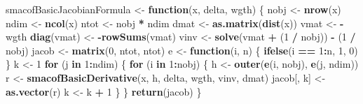 \documentclass[
  12pt,
]{article}
\newenvironment{Shaded}{\begin{snugshade}}{\end{snugshade}}
\newcommand{\ControlFlowTok}[1]{\textcolor[rgb]{0.13,0.29,0.53}{\textbf{#1}}}
\newcommand{\DecValTok}[1]{\textcolor[rgb]{0.00,0.00,0.81}{#1}}
\newcommand{\FunctionTok}[1]{\textcolor[rgb]{0.13,0.29,0.53}{\textbf{#1}}}
\newcommand{\NormalTok}[1]{#1}
\newcommand{\OtherTok}[1]{\textcolor[rgb]{0.56,0.35,0.01}{#1}}
\newcommand{\SpecialCharTok}[1]{\textcolor[rgb]{0.81,0.36,0.00}{\textbf{#1}}}
\begin{document}
\begin{Shaded}
\begin{Highlighting}[]
\NormalTok{smacofBasicJacobianFormula }\OtherTok{\textless{}{-}} \ControlFlowTok{function}\NormalTok{(x, delta, wgth) \{}
\NormalTok{  nobj }\OtherTok{\textless{}{-}} \FunctionTok{nrow}\NormalTok{(x)}
\NormalTok{  ndim }\OtherTok{\textless{}{-}} \FunctionTok{ncol}\NormalTok{(x)}
\NormalTok{  ntot }\OtherTok{\textless{}{-}}\NormalTok{ nobj }\SpecialCharTok{*}\NormalTok{ ndim}
\NormalTok{  dmat }\OtherTok{\textless{}{-}} \FunctionTok{as.matrix}\NormalTok{(}\FunctionTok{dist}\NormalTok{(x))}
\NormalTok{  vmat }\OtherTok{\textless{}{-}} \SpecialCharTok{{-}}\NormalTok{wgth}
  \FunctionTok{diag}\NormalTok{(vmat) }\OtherTok{\textless{}{-}} \SpecialCharTok{{-}}\FunctionTok{rowSums}\NormalTok{(vmat)}
\NormalTok{  vinv }\OtherTok{\textless{}{-}} \FunctionTok{solve}\NormalTok{(vmat }\SpecialCharTok{+}\NormalTok{ (}\DecValTok{1} \SpecialCharTok{/}\NormalTok{ nobj)) }\SpecialCharTok{{-}}\NormalTok{ (}\DecValTok{1} \SpecialCharTok{/}\NormalTok{ nobj)}
\NormalTok{  jacob }\OtherTok{\textless{}{-}} \FunctionTok{matrix}\NormalTok{(}\DecValTok{0}\NormalTok{, ntot, ntot)}
\NormalTok{  e }\OtherTok{\textless{}{-}} \ControlFlowTok{function}\NormalTok{(i, n) \{}
    \FunctionTok{ifelse}\NormalTok{(i }\SpecialCharTok{==} \DecValTok{1}\SpecialCharTok{:}\NormalTok{n, }\DecValTok{1}\NormalTok{, }\DecValTok{0}\NormalTok{)}
\NormalTok{  \}}
\NormalTok{  k }\OtherTok{\textless{}{-}} \DecValTok{1}
  \ControlFlowTok{for}\NormalTok{ (j }\ControlFlowTok{in} \DecValTok{1}\SpecialCharTok{:}\NormalTok{ndim) \{}
    \ControlFlowTok{for}\NormalTok{ (i }\ControlFlowTok{in} \DecValTok{1}\SpecialCharTok{:}\NormalTok{nobj) \{}
\NormalTok{      h }\OtherTok{\textless{}{-}} \FunctionTok{outer}\NormalTok{(}\FunctionTok{e}\NormalTok{(i, nobj), }\FunctionTok{e}\NormalTok{(j, ndim))}
\NormalTok{      r }\OtherTok{\textless{}{-}} \FunctionTok{smacofBasicDerivative}\NormalTok{(x, h, delta, wgth, vinv, dmat)}
\NormalTok{      jacob[, k] }\OtherTok{\textless{}{-}} \FunctionTok{as.vector}\NormalTok{(r)}
\NormalTok{      k }\OtherTok{\textless{}{-}}\NormalTok{ k }\SpecialCharTok{+} \DecValTok{1}
\NormalTok{    \}}
\NormalTok{  \}}
  \FunctionTok{return}\NormalTok{(jacob)}
\NormalTok{\}}


\end{Highlighting}
\end{Shaded}
\end{document}
